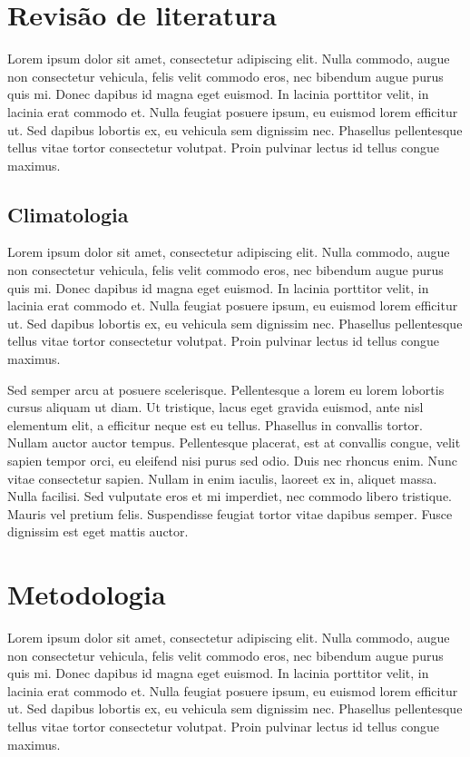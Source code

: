 \documentclass[brazil,hardcopy,openany,a5paper]{ufscthesis}
\begin{document}
\chapter{Revisão de literatura}
	
	Lorem ipsum dolor sit amet, consectetur adipiscing elit. Nulla commodo, augue non consectetur vehicula, felis velit commodo eros, nec bibendum augue purus quis mi. Donec dapibus id magna eget euismod. In lacinia porttitor velit, in lacinia erat commodo et. Nulla feugiat posuere ipsum, eu euismod lorem efficitur ut. Sed dapibus lobortis ex, eu vehicula sem dignissim nec. Phasellus pellentesque tellus vitae tortor consectetur volutpat. Proin pulvinar lectus id tellus congue maximus.
	
	
	\section{Climatologia}
	
	Lorem ipsum dolor sit amet, consectetur adipiscing elit. Nulla commodo, augue non consectetur vehicula, felis velit commodo eros, nec bibendum augue purus quis mi. Donec dapibus id magna eget euismod. In lacinia porttitor velit, in lacinia erat commodo et. Nulla feugiat posuere ipsum, eu euismod lorem efficitur ut. Sed dapibus lobortis ex, eu vehicula sem dignissim nec. Phasellus pellentesque tellus vitae tortor consectetur volutpat. Proin pulvinar lectus id tellus congue maximus.

	Sed semper arcu at posuere scelerisque. Pellentesque a lorem eu lorem lobortis cursus aliquam ut diam. Ut tristique, lacus eget gravida euismod, ante nisl elementum elit, a efficitur neque est eu tellus. Phasellus in convallis tortor. Nullam auctor auctor tempus. Pellentesque placerat, est at convallis congue, velit sapien tempor orci, eu eleifend nisi purus sed odio. Duis nec rhoncus enim. Nunc vitae consectetur sapien. Nullam in enim iaculis, laoreet ex in, aliquet massa. Nulla facilisi. Sed vulputate eros et mi imperdiet, nec commodo libero tristique. Mauris vel pretium felis. Suspendisse feugiat tortor vitae dapibus semper. Fusce dignissim est eget mattis auctor.
	
		\chapter{Metodologia}
		\label{chapter:metodologia}

	Lorem ipsum dolor sit amet, consectetur adipiscing elit. Nulla commodo, augue non consectetur vehicula, felis velit commodo eros, nec bibendum augue purus quis mi. Donec dapibus id magna eget euismod. In lacinia porttitor velit, in lacinia erat commodo et. Nulla feugiat posuere ipsum, eu euismod lorem efficitur ut. Sed dapibus lobortis ex, eu vehicula sem dignissim nec. Phasellus pellentesque tellus vitae tortor consectetur volutpat. Proin pulvinar lectus id tellus congue maximus.
\end{document}
